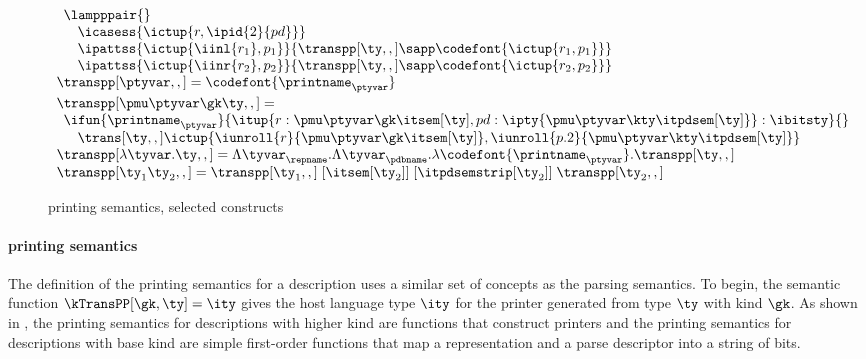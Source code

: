 \begin{figure}
\[\begin{array}{l}
  \begin{array}{l}  
  \lampppair{} \\
  \quad \icasess {\ictup{r,\ipid{2}{pd}}} \\
  \quad \ipattss{\ictup{\iinl{r_1}, p_1}} 
	{ {\transpp[\ty,,]} \sapp \codefont{\ictup{r_1,p_1}}}\\
  \quad \ipattss{\ictup{\iinr{r_2}, p_2}} 
	{ {\transpp[\ty,,]} \sapp \codefont{\ictup{r_2,p_2}}}\\
  \end{array}
\\[3pt]
\transpp[\ptyvar,,] = \codefont{\printname_\ptyvar}
\\[3pt]
\transpp[\pmu \ptyvar \gk \ty,,] = \\
  \begin{array}{l}
  \ifun {\printname_\ptyvar} {\itup{r:\pmu \ptyvar \gk \itsem[\ty], pd:\ipty{\pmu \ptyvar \kty \itpdsem[\ty]}}
                     : \ibitsty} {}\\
  \quad \trans[\ty,,] \ictup{\iunroll{r}{\pmu \ptyvar \gk \itsem[\ty]},
     \iunroll{p.2}{\pmu \ptyvar \kty \itpdsem[\ty]}}
  \end{array}  
\\[3pt]
\transpp[\lambda\tyvar . \ty,,] = %
    \Lambda \tyvar_\repname. 
    \Lambda \tyvar_\pdbname. \lambda \codefont{\printname_\ptyvar}. \transpp[\ty,,]
\\
\transpp[\ty_1 \ty_2,,] = 
    \transpp[\ty_1,,]\; [\itsem[\ty_2]]\; [\itpdsemstrip[\ty_2]]\; \transpp[\ty_2,,]
\\
\end{array}
\]
\caption{\ddc{} printing semantics, selected constructs}
\label{fig:ddc-print-sem}
\end{figure}


\paragraph*{\ddc{} printing semantics}
\label{sec:print-sem}
The definition of the printing semantics for a \ddc{} description
uses a similar set of concepts as the parsing semantics.  To begin,
the semantic function $\kTransPP[\gk,\ty] = \ity$ gives the
host language type $\ity$ for the printer generated from type $\ty$
with kind $\gk$.  As shown in ,
the printing semantics for descriptions with higher kind are functions that
construct printers and the printing semantics for descriptions with base kind
are simple first-order functions that map a representation and a
parse descriptor into a string of bits.

